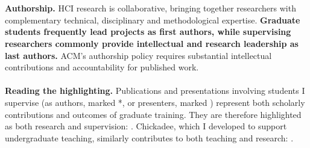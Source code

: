 \documentclass[11pt]{article}
\begin{document}
\\ \\
\textbf{Authorship.} HCI research is collaborative, bringing together researchers with complementary technical, disciplinary and methodological expertise. \textbf{Graduate students frequently lead projects as first authors, while supervising researchers commonly provide intellectual and research leadership as last authors.} ACM's authorship policy requires substantial intellectual contributions and accountability for published work.
\\ \\
\textbf{Reading the highlighting.} Publications and presentations involving students I supervise (as authors, marked *, or presenters, marked \dag) represent both scholarly contributions and outcomes of graduate training. They are therefore highlighted as both research and supervision: . Chickadee, which I developed to support undergraduate teaching, similarly contributes to both teaching and research: .
\end{document}
